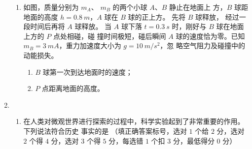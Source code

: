 \begin{enumerate}
\begin{enumerate}
\item 
如图，质量分别为 $ m_{A} $、 $ m_{B} $ 的两个小球 $ A $、$ B $ 静止在地面上
方，$ B $ 球距地面的高度 $ h=0.8 \ m $，$ A $ 球在 $ B $ 球的正上方。 先将 $ B $ 球释放，
经过一段时间后再将 $ A $ 球释放。 当 $ A $ 球下落 $ t=0.3 \ s $ 时，刚好与 $ B $ 球在地面上方的 $ P $ 点处相碰，碰
撞时间极短，碰后瞬间 $ A $ 球的速度恰为零。已知 $ m_{B}  =3 \ mA $，重力加速度大小为 $ g=10 \ m/s^{2} $，忽
略空气阻力及碰撞中的动能损失。
\begin{enumerate}
	\item
$ B $ 球第一次到达地面时的速度；
\item 
$ P $ 点距离地面的高度。
	
\end{enumerate}
\begin{figure}[h!]
	\flushright
	
\end{figure}


	
\end{enumerate}



\item 
{}
\begin{enumerate}
	\item
在人类对微观世界进行探索的过程中，科学实验起到了非常重要的作用。下列说法符合历史
事实的是
 \underlinegap 
（填正确答案标号，选对 $ 1 $ 个给 $ 2 $ 分，选对 $ 2 $ 个得 $ 4 $ 分，选对 $ 3 $ 个得 $ 5 $ 分，每选错 $ 1 $
个扣 $ 3 $ 分，最低得分 $ 0 $ 分）


\end{enumerate}
\end{enumerate}
